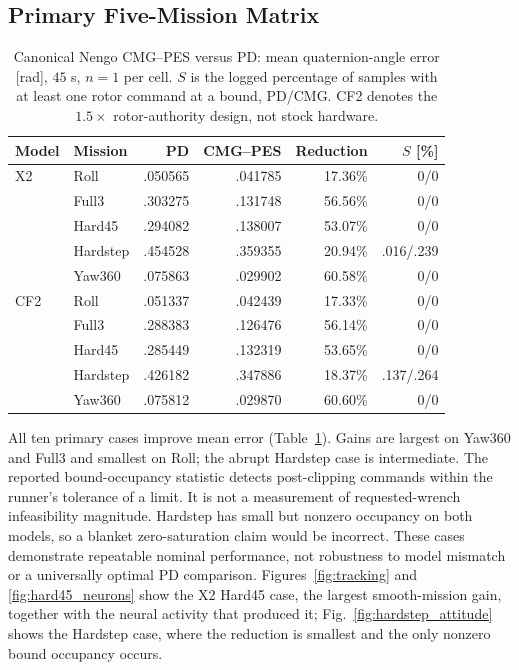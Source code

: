 \documentclass[letterpaper,10pt,conference]{IEEEtran}
\begin{document}
\subsection{Primary Five-Mission Matrix}
\begin{table}[t]
\caption{Canonical Nengo CMG--PES versus PD: mean quaternion-angle error
[rad], $45$ s, $n=1$ per cell. $S$ is the logged percentage of samples with
at least one rotor command at a bound, PD/CMG. CF2 denotes the $1.5\times$
rotor-authority design, not stock hardware.}
\label{tab:mujoco}\centering\scriptsize
\setlength{\tabcolsep}{3pt}
\begin{tabular}{llrrrr}
\toprule
Model&Mission&PD&CMG--PES&Reduction&$S$ [\%]\\\midrule
X2&Roll&.050565&.041785&17.36\%&0/0\\
&Full3&.303275&.131748&56.56\%&0/0\\
&Hard45&.294082&.138007&53.07\%&0/0\\
&Hardstep&.454528&.359355&20.94\%&.016/.239\\
&Yaw360&.075863&.029902&60.58\%&0/0\\\midrule
CF2&Roll&.051337&.042439&17.33\%&0/0\\
&Full3&.288383&.126476&56.14\%&0/0\\
&Hard45&.285449&.132319&53.65\%&0/0\\
&Hardstep&.426182&.347886&18.37\%&.137/.264\\
&Yaw360&.075812&.029870&60.60\%&0/0\\\bottomrule
\end{tabular}
\end{table}
All ten primary cases improve mean error (Table~\ref{tab:mujoco}). Gains
are largest on Yaw360 and Full3 and smallest on Roll; the abrupt Hardstep
case is intermediate. The reported bound-occupancy statistic detects
post-clipping commands within the runner's tolerance of a limit. It is not
a measurement of requested-wrench infeasibility magnitude. Hardstep has
small but nonzero occupancy on both models, so a blanket zero-saturation
claim would be incorrect. These cases demonstrate repeatable nominal
performance, not robustness to model mismatch or a universally optimal PD
comparison. Figures~\ref{fig:tracking} and \ref{fig:hard45_neurons} show
the X2 Hard45 case, the largest smooth-mission gain, together with the
neural activity that produced it; Fig.~\ref{fig:hardstep_attitude} shows
the Hardstep case, where the reduction is smallest and the only nonzero
bound occupancy occurs.
\end{document}
